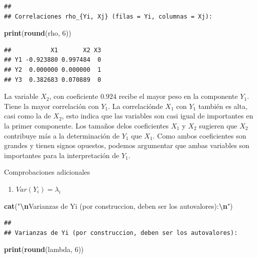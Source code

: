 \documentclass[
]{book}
\newenvironment{Shaded}{\begin{snugshade}}{\end{snugshade}}
\newcommand{\DecValTok}[1]{\textcolor[rgb]{0.00,0.00,0.81}{#1}}
\newcommand{\FunctionTok}[1]{\textcolor[rgb]{0.13,0.29,0.53}{\textbf{#1}}}
\newcommand{\NormalTok}[1]{#1}
\newcommand{\SpecialCharTok}[1]{\textcolor[rgb]{0.81,0.36,0.00}{\textbf{#1}}}
\newcommand{\StringTok}[1]{\textcolor[rgb]{0.31,0.60,0.02}{#1}}
\providecommand{\tightlist}{%
  \setlength{\itemsep}{0pt}\setlength{\parskip}{0pt}}
\begin{document}
\begin{verbatim}
## 
## Correlaciones rho_{Yi, Xj} (filas = Yi, columnas = Xj):
\end{verbatim}

\begin{Shaded}
\begin{Highlighting}[]
\FunctionTok{print}\NormalTok{(}\FunctionTok{round}\NormalTok{(rho, }\DecValTok{6}\NormalTok{))}
\end{Highlighting}
\end{Shaded}

\begin{verbatim}
##           X1       X2 X3
## Y1 -0.923880 0.997484  0
## Y2  0.000000 0.000000  1
## Y3  0.382683 0.070889  0
\end{verbatim}

La variable \(X_2\), con coeficiente \(0.924\) recibe el mayor peso en la componente \(Y_1\). Tiene la mayor correlación con \(Y_1\). La correlaciónde \(X_1\) con \(Y_1\) también es alta, casi como la de \(X_2\), esto indica que las variables son casi igual de importantes en la primer componente. Los tamaños delos coeficientes \(X_1\) y \(X_2\) sugieren que \(X_2\) contribuye más a la determinación de \(Y_1\) que \(X_1\). Como ambos coeficientes son grandes y tienen signos opuestos, podemos argumentar que ambas variables son importantes para la interpretación de \(Y_1\).

Comprobaciones adicionales

\begin{enumerate}
\def\labelenumi{\arabic{enumi})}
\tightlist
\item
  \(Var(Y_i) = \lambda_i\)
\end{enumerate}

\begin{Shaded}
\begin{Highlighting}[]
\FunctionTok{cat}\NormalTok{(}\StringTok{"}\SpecialCharTok{\textbackslash{}n}\StringTok{Varianzas de Yi (por construccion, deben ser los autovalores):}\SpecialCharTok{\textbackslash{}n}\StringTok{"}\NormalTok{)}
\end{Highlighting}
\end{Shaded}

\begin{verbatim}
## 
## Varianzas de Yi (por construccion, deben ser los autovalores):
\end{verbatim}

\begin{Shaded}
\begin{Highlighting}[]
\FunctionTok{print}\NormalTok{(}\FunctionTok{round}\NormalTok{(lambda, }\DecValTok{6}\NormalTok{))}
\end{Highlighting}
\end{Shaded}
\end{document}
